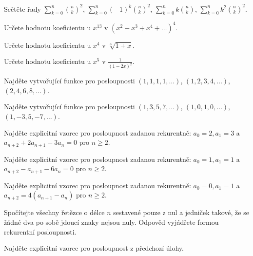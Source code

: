 \begin{t_exercise}
  \item Sečtěte řady $\sum_{k=0}^n \binom{n}{k}^2$, $\sum_{k=0}^n (-1)^k\binom{n}{k}^2$, $\sum_{k=0}^n k\binom{n}{k}$, $\sum_{k=0}^n k^2\binom{n}{k}^2$.
  \item Určete hodnotu koeficientu u $x^{13}$ v $(x^2+x^3+x^4+\dots)^4$.
  \item Určete hodnotu koeficientu u $x^4$ v $\sqrt[3]{1+x}$.
  \item Určete hodnotu koeficientu u $x^5$ v $\frac{1}{(1-2x)^2}$.
  \item Najděte vytvořující funkce pro posloupnosti $(1, 1, 1, 1, \dots)$, $(1, 2, 3, 4, \dots)$, $(2, 4, 6, 8, \dots)$.
  \item Najděte vytvořující funkce pro posloupnosti $(1, 3, 5, 7, \dots)$, $(1, 0, 1, 0, \dots)$, $(1, -3, 5, -7, \dots)$.
  \item Najděte explicitní vzorec pro posloupnost zadanou rekurentně: $a_0=2, a_1=3$ a $a_{n+2}+2a_{n+1}-3a_n=0$ pro $n\geq 2$.
  \item Najděte explicitní vzorec pro posloupnost zadanou rekurentně: $a_0=1, a_1=1$ a $a_{n+2}-a_{n+1}-6a_n=0$ pro $n\geq 2$.
  \item Najděte explicitní vzorec pro posloupnost zadanou rekurentně: $a_0=0, a_1=1$ a $a_{n+2}=4(a_{n+1}-a_n)$ pro $n\geq 2$.
  \item Spočítejte všechny řetězce o délce $n$ sestavené pouze z nul a jedniček takové, že se žádné dva po sobě jdoucí znaky nejsou nuly. Odpověď vyjádřete formou rekurentní posloupnosti.
  \item Najděte explicitní vzorec pro posloupnost z předchozí úlohy.
\end{t_exercise}